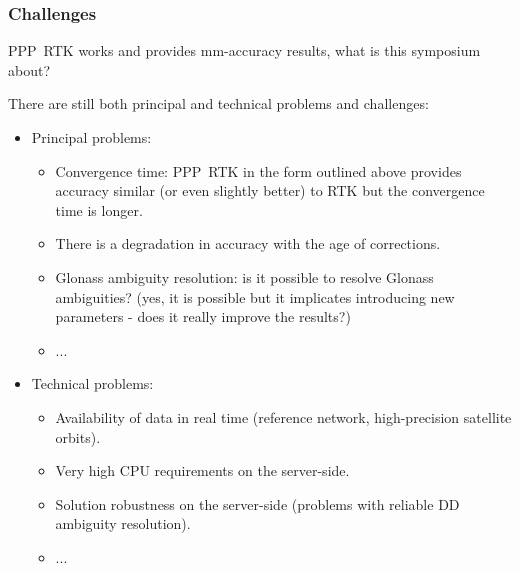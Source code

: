 \documentclass[10pt]{beamer}
\begin{document}

\begin{frame}
  \frametitle{Challenges}
  PPP~RTK works and provides mm-accuracy results, what is this symposium
  about?

  \pause
  There are still both principal and technical problems and challenges:
  \begin{itemize}
  \item Principal problems:
    \begin{itemize}
    \item Convergence time: PPP~RTK in the form outlined above provides
      accuracy similar (or even slightly better) to RTK but the convergence
      time is longer.
    \item There is a degradation in accuracy with the age of corrections.
    \item Glonass ambiguity resolution: is it possible to resolve Glonass
      ambiguities? (yes, it is possible but it implicates introducing new
      parameters - does it really improve the results?)
    \item ...
    \end{itemize}
  \item Technical problems:
    \begin{itemize}
    \item Availability of data in real time (reference network, high-precision
          satellite orbits).
    \item Very high CPU requirements on the server-side.
    \item Solution robustness on the server-side 
          (problems with reliable DD ambiguity resolution). 
    \item ...
    \end{itemize}
  \end{itemize}
\end{frame}

\end{document}
